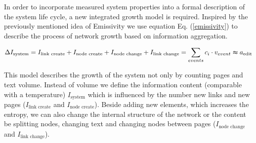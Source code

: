 \documentclass[a4paper,10pt]{scrbook}
\begin{document}


In order to incorporate measured system properties into a formal description of the system life cycle, a new integrated growth model is required. Inspired by the previously mentioned idea of Emissivity we use equation Eq. (\ref{emissivity}) to describe the process of network growth based on information aggregation. 

\begin{equation}
\Delta I_{\text{system}} = I_{\text{link create}} + I_{\text{node create}} + I_{\text{node change}} + I_{\text{link change}} =  \sum_{events} c_i \cdot v_{event} \thickapprox a_{\text{edit}} 
\label{emissivity} 
\end{equation}

This model describes the growth of the system not only by counting pages and text volume. Instead of volume we define the information content (comparable with a temperature) $I_{\text{system}}$ which is influenced by the number new links and new pages ($ I_{\text{link create}}$ and $I_{\text{node create}}$). Beside adding new elements, which increases the entropy, we can also change the internal structure of the network or the content be splitting nodes, changing text and changing nodes between pages ($I_{\text{node change}}$ and $I_{\text{link change}}$). 
\end{document}
